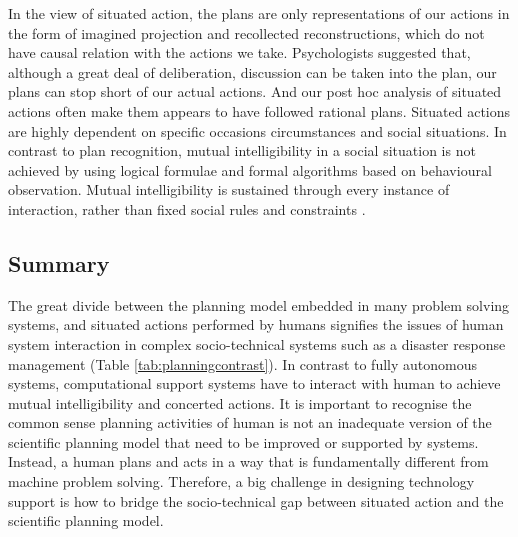 In the view of situated action, the plans are only representations of our actions in the form of imagined projection and recollected reconstructions, which do not have causal relation with the actions we take. Psychologists \citep{Mead1934} suggested that, although a great deal of deliberation, discussion can be taken into the plan, our plans can stop short of our actual actions. And our post hoc analysis of situated actions often make them appears to have followed rational plans. Situated actions are highly dependent on specific occasions circumstances and social situations. In contrast to plan recognition, mutual intelligibility in a social situation is not achieved by using logical formulae and formal algorithms based on behavioural observation.  Mutual intelligibility is sustained through every instance of interaction, rather than fixed social rules and constraints \citep{Suchman1987}.\\


\subsection{Summary}
The great divide between the planning model embedded in many problem solving systems, and situated actions performed by humans signifies the issues of human system interaction in complex socio-technical systems such as a disaster response management (Table \ref{tab:planningcontrast}). In contrast to fully autonomous systems, computational support systems have to interact with human to achieve mutual intelligibility and concerted actions. It is important to recognise the common sense planning activities of human is not an inadequate version of the scientific planning model that need to be improved or supported by systems. Instead, a human plans and acts in a way that is fundamentally different from machine problem solving. Therefore, a big challenge in designing technology support is how to bridge the socio-technical gap between situated action and the scientific planning model.\\

